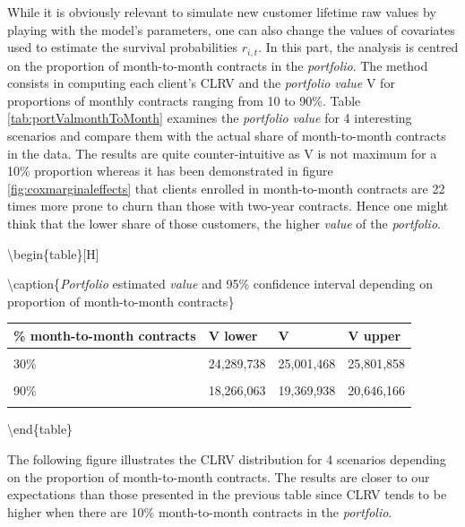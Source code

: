 \documentclass[
]{book}
\begin{document}
While it is obviously relevant to simulate new customer lifetime raw values by playing with the model's parameters, one can also change the values of covariates used to estimate the survival probabilities \(r_{i,t}\). In this part, the analysis is centred on the proportion of month-to-month contracts in the \emph{portfolio}. The method consists in computing each client's CLRV and the \emph{portfolio} \emph{value} V for proportions of monthly contracts ranging from 10 to 90\%. Table \ref{tab:portValmonthToMonth} examines the \emph{portfolio} \emph{value} for 4 interesting scenarios and compare them with the actual share of month-to-month contracts in the data. The results are quite counter-intuitive as V is not maximum for a 10\% proportion whereas it has been demonstrated in figure \ref{fig:coxmarginaleffects} that clients enrolled in month-to-month contracts are 22 times more prone to churn than those with two-year contracts. Hence one might think that the lower share of those customers, the higher \emph{value} of the \emph{portfolio}.

\textbackslash begin\{table\}{[}H{]}

\textbackslash caption\{\label{tab:portValmonthToMonth}\emph{Portfolio} estimated \emph{value} and 95\% confidence interval depending on proportion of month-to-month contracts\}
\centering

\begin{tabular}[t]{llll}
\toprule
\% month-to-month contracts & V lower & V & V upper\\
\midrule
\cellcolor{gray!6}{10\%} & \cellcolor{gray!6}{22,526,500} & \cellcolor{gray!6}{23,009,290} & \cellcolor{gray!6}{23,535,331}\\
30\% & 24,289,738 & 25,001,468 & 25,801,858\\
\cellcolor{gray!6}{70\%} & \cellcolor{gray!6}{19,763,605} & \cellcolor{gray!6}{20,706,782} & \cellcolor{gray!6}{21,796,005}\\
90\% & 18,266,063 & 19,369,938 & 20,646,166\\
\cellcolor{gray!6}{55.1\% (reference)} & \cellcolor{gray!6}{17,604,144} & \cellcolor{gray!6}{18,270,000} & \cellcolor{gray!6}{19,031,648}\\
\bottomrule
\end{tabular}

\textbackslash end\{table\}

The following figure illustrates the CLRV distribution for 4 scenarios depending on the proportion of month-to-month contracts. The results are closer to our expectations than those presented in the previous table since CLRV tends to be higher when there are 10\% month-to-month contracts in the \emph{portfolio}.
\end{document}
